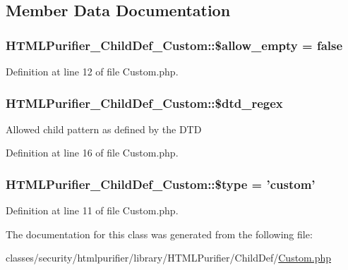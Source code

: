 \subsection{Member Data Documentation}
\hypertarget{classHTMLPurifier__ChildDef__Custom_acac362eee284fbd3acf67d15bc2acdd9}{
\subsubsection[{\$allow\+\_\+empty}]{\setlength{\rightskip}{0pt plus 5cm}H\+T\+M\+L\+Purifier\+\_\+\+Child\+Def\+\_\+\+Custom\+::\$allow\+\_\+empty = false}}\label{classHTMLPurifier__ChildDef__Custom_acac362eee284fbd3acf67d15bc2acdd9}


Definition at line 12 of file Custom.\+php.

\hypertarget{classHTMLPurifier__ChildDef__Custom_a72b76ac39dbaa12629440dd7c0dfacf8}{
\subsubsection[{\$dtd\+\_\+regex}]{\setlength{\rightskip}{0pt plus 5cm}H\+T\+M\+L\+Purifier\+\_\+\+Child\+Def\+\_\+\+Custom\+::\$dtd\+\_\+regex}}\label{classHTMLPurifier__ChildDef__Custom_a72b76ac39dbaa12629440dd7c0dfacf8}
Allowed child pattern as defined by the D\+T\+D 

Definition at line 16 of file Custom.\+php.

\hypertarget{classHTMLPurifier__ChildDef__Custom_aa367d716379195c16bb9174a7c8b8dde}{
\subsubsection[{\$type}]{\setlength{\rightskip}{0pt plus 5cm}H\+T\+M\+L\+Purifier\+\_\+\+Child\+Def\+\_\+\+Custom\+::\$type = 'custom'}}\label{classHTMLPurifier__ChildDef__Custom_aa367d716379195c16bb9174a7c8b8dde}


Definition at line 11 of file Custom.\+php.



The documentation for this class was generated from the following file\+:\begin{DoxyCompactItemize}
\item 
classes/security/htmlpurifier/library/\+H\+T\+M\+L\+Purifier/\+Child\+Def/\hyperlink{Custom_8php}{Custom.\+php}\end{DoxyCompactItemize}
